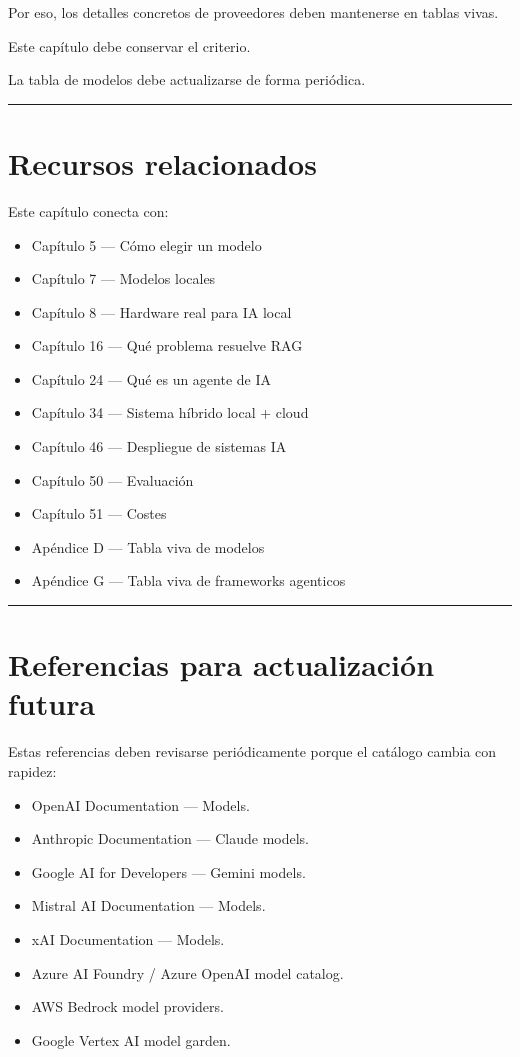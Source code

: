 Por eso, los detalles concretos de proveedores deben mantenerse en
tablas vivas.

Este capítulo debe conservar el criterio.

La tabla de modelos debe actualizarse de forma periódica.

\begin{center}\rule{0.5\linewidth}{0.5pt}\end{center}

\section{Recursos relacionados}\label{recursos-relacionados-5}

Este capítulo conecta con:

\begin{itemize}
\tightlist
\item
  Capítulo 5 --- Cómo elegir un modelo
\item
  Capítulo 7 --- Modelos locales
\item
  Capítulo 8 --- Hardware real para IA local
\item
  Capítulo 16 --- Qué problema resuelve RAG
\item
  Capítulo 24 --- Qué es un agente de IA
\item
  Capítulo 34 --- Sistema híbrido local + cloud
\item
  Capítulo 46 --- Despliegue de sistemas IA
\item
  Capítulo 50 --- Evaluación
\item
  Capítulo 51 --- Costes
\item
  Apéndice D --- Tabla viva de modelos
\item
  Apéndice G --- Tabla viva de frameworks agenticos
\end{itemize}

\begin{center}\rule{0.5\linewidth}{0.5pt}\end{center}

\section{Referencias para actualización
futura}\label{referencias-para-actualizaciuxf3n-futura}

Estas referencias deben revisarse periódicamente porque el catálogo
cambia con rapidez:

\begin{itemize}
\tightlist
\item
  OpenAI Documentation --- Models.
\item
  Anthropic Documentation --- Claude models.
\item
  Google AI for Developers --- Gemini models.
\item
  Mistral AI Documentation --- Models.
\item
  xAI Documentation --- Models.
\item
  Azure AI Foundry / Azure OpenAI model catalog.
\item
  AWS Bedrock model providers.
\item
  Google Vertex AI model garden.
\end{itemize}

